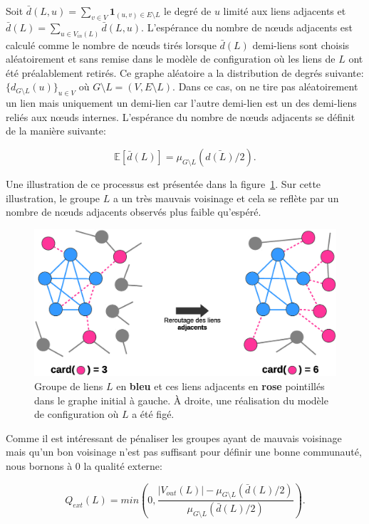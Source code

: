 Soit $\bar{d}(L,u) = \sum_{v \in V} \mathbf{1}_{(u,v) \in E \setminus L}$ le degré de $u$ limité aux liens adjacents et $\bar{d}(L)=\sum_{u \in V_{in}(L)} \bar{d}(L,u)$.
L'espérance du nombre de n\oe uds adjacents est calculé comme le nombre de n\oe uds tirés lorsque $\bar{d}(L)$ demi-liens sont choisis aléatoirement et sans remise dans le modèle de configuration où les liens de $L$ ont été préalablement retirés.
Ce graphe aléatoire a la distribution de degrés suivante: $\{d_{G \setminus L }(u)\}_{u \in V}$ où $G \setminus L = (V,E\setminus L)$.
Dans ce cas, on ne tire pas aléatoirement un lien mais uniquement un demi-lien car l'autre demi-lien est un des demi-liens reliés aux n\oe uds internes.
L'espérance du nombre de n\oe uds adjacents se définit de la manière suivante:

\begin{equation}
	\mathbb{E}[\bar{d}(L)] = \mu_{G\setminus L}(\bar{d(L)}/2).
\end{equation}

Une illustration de ce processus est présentée dans la figure~\ref{fig:retourt_ext}.
Sur cette illustration, le groupe $L$ a un très mauvais voisinage et cela se reflète par un nombre de n\oe uds adjacents observés plus faible qu'espéré.

\begin{figure}
\centering
\includegraphics[width=0.7\linewidth]{img/ExpectedNodes/reroutageExt3}
\caption{Groupe de liens $L$ en \textcolor{semilightblue}{\textbf{bleu}} et ces liens adjacents en \textcolor{pinkyred}{\textbf{rose}} pointillés dans le graphe initial à gauche.
\`A droite, une réalisation du modèle de configuration où $L$ a été figé.}
\label{fig:retourt_ext}
\end{figure}

Comme il est intéressant de pénaliser les groupes ayant de mauvais voisinage mais qu'un bon voisinage n'est pas suffisant pour définir une bonne communauté, nous bornons à $0$ la qualité externe:

\begin{equation}
\label{eq:qext} Q_{ext}(L) = min \left(0, \dfrac{|V_{out}(L)| - \mu_{G\setminus L}(\bar{d}(L)/2)}{\mu_{G\setminus L}(\bar{d}(L)/2)} \right).
\end{equation}


